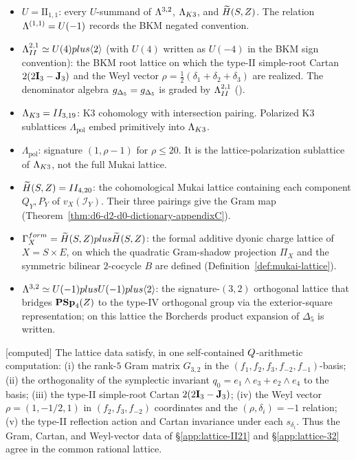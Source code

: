 \begin{itemize}
\item $U=\mathrm{II}_{1,1}$: every $U$-summand of
$\Lambda^{3,2}$, $\Lambda_{K3}$, and $\widetilde H(S,Z)$.  The relation
$\Lambda^{(1,1)}=U(-1)$ records the BKM negated convention.
\item $\Lambda_{II}^{2,1}\simeq U(4)plus\langle 2\rangle$ (with
$U(4)$ written as \(U(-4)\) in the BKM sign convention):
the BKM root lattice on which the type-II simple-root Cartan
$2(2\mathbf{I}_3-\mathbf{J}_3)$ and the Weyl vector
$\rho=\frac12(\delta_1+\delta_2+\delta_3)$ are realized.  The
denominator algebra
${g_{\Delta_5}}=g_{\Delta_5}$ is graded by $\Lambda_{II}^{2,1}$
(\cite[Theorem~2.1]{GNII}).
\item $\Lambda_{K3}=II_{3,19}$: K3 cohomology with
intersection pairing.  Polarized K3 sublattices \(\Lambda_{\mathrm{pol}}\) embed
primitively into $\Lambda_{K3}$.
\item \(\Lambda_{\mathrm{pol}}\): signature $(1,\rho-1)$ for $\rho\le20$.  It is the lattice-polarization sublattice of
\(\Lambda_{K3}\), not the full Mukai lattice.
\item $\widetilde H(S,Z)=II_{4,20}$: the cohomological
Mukai lattice containing each component $Q_Y,P_Y$ of
$v_X(\mathcal I_Y)$.  Their three pairings give the Gram map
(Theorem~\ref{thm:d6-d2-d0-dictionary-appendixC}).
\item
\(\Gamma_X^{form}
=\widetilde H(S,Z)plus\widetilde H(S,Z)\): the formal
additive dyonic charge lattice of $X=S\times E$, on which the
quadratic Gram-shadow projection $\Pi_X$ and the symmetric bilinear
$2$-cocycle $B$ are defined
(Definition~\ref{def:mukai-lattice}).
\item $\Lambda^{3,2}\simeq U(-1)plus U(-1)plus\langle 2\rangle$:
the signature-$(3,2)$ orthogonal lattice that bridges
$\mathbf{PSp}_4(Z)$ to the type-IV orthogonal group via the exterior-square
representation; on this lattice the Borcherds product expansion of
$\Delta_5$ is written.
\end{itemize}

\begin{verification}
\label{ver:lattice-rational-check}
\textnormal{[computed]}
The lattice data satisfy, in one self-contained $Q$-arithmetic
computation:
(i) the rank-$5$ Gram matrix $G_{3,2}$ in the
$(f_1,f_2,f_3,f_{-2},f_{-1})$-basis;
(ii) the orthogonality of the symplectic invariant
$q_0=e_1\wedge e_3+e_2\wedge e_4$ to the basis;
(iii) the type-II simple-root Cartan
$2(2\mathbf{I}_3-\mathbf{J}_3)$;
(iv) the Weyl vector $\rho=(1,-1/2,1)$ in $(f_2,f_3,f_{-2})$
coordinates and the $(\rho,\delta_i)=-1$ relation;
(v) the type-II reflection action and Cartan invariance under each
$s_{\delta_i}$.
Thus the Gram, Cartan, and
Weyl-vector data of \S\ref{app:lattice-II21} and \S\ref{app:lattice-32}
agree in the common rational lattice.
\end{verification}

